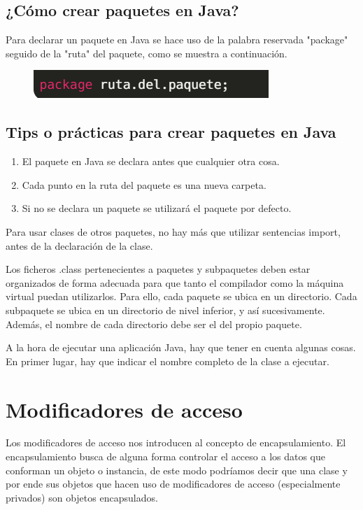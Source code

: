 \documentclass[12pt,a4paper]{report}
\begin{document}
{\subsection*{¿Cómo crear paquetes en Java?}
Para declarar un paquete en Java se hace uso de la palabra reservada "package" seguido de la "ruta" del paquete, como se muestra a continuación.
\begin{figure}[hbtp]
\centering
\includegraphics[scale=1]{1.PNG}
\end{figure}
\subsection*{Tips o prácticas para crear paquetes en Java}
\begin{enumerate}
\item El paquete en Java se declara antes que cualquier otra cosa.
\item Cada punto en la ruta del paquete es una nueva carpeta.
\item Si no se declara un paquete se utilizará el paquete por defecto.
\end{enumerate}
\bigskip Para usar clases de otros paquetes, no hay más que utilizar sentencias import, antes de la declaración de la clase.


Los ficheros .class pertenecientes a paquetes y subpaquetes deben estar organizados de forma adecuada para que tanto el compilador como la máquina virtual puedan utilizarlos.
Para ello, cada paquete se ubica en un directorio. Cada subpaquete se ubica en un directorio de nivel inferior, y así sucesivamente. Además, el nombre de cada directorio debe ser el del propio paquete.

A la hora de ejecutar una aplicación Java, hay que tener en cuenta algunas cosas. En primer lugar, hay que indicar el nombre completo de la clase a ejecutar.
\section*{Modificadores de acceso}
Los modificadores de acceso nos introducen al concepto de encapsulamiento. El encapsulamiento busca de alguna forma controlar el acceso a los datos que conforman un objeto o instancia, de este modo podríamos decir que una clase y por ende sus objetos que hacen uso de modificadores de acceso (especialmente privados) son objetos encapsulados.

}
\end{document}
